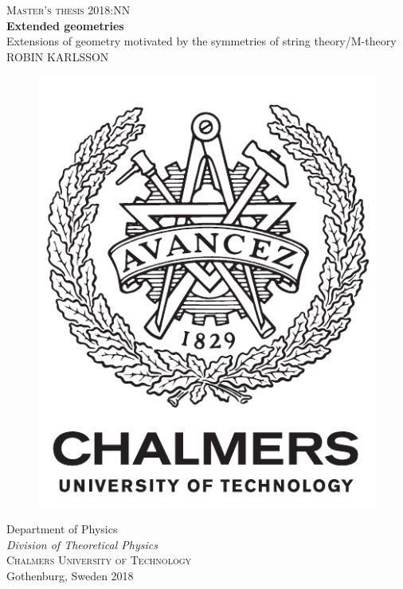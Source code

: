 \newpage
\thispagestyle{empty}
\begin{center}
	\textsc{\large Master's thesis 2018:NN}\\[4cm]		%
	\textbf{{\Huge 	Extended geometries}} 	\\[1cm]
	{\large Extensions of geometry motivated by the symmetries of string theory/M-theory}\\[1cm]
	{\large ROBIN KARLSSON}
	
	\vfill	
	\begin{figure}[H]
	\centering
	\includegraphics[width=0.2\pdfpagewidth]{figure/auxiliary/logo_eng.pdf} \\	
	\end{figure}	\vspace{5mm}	
	
	Department of Physics \\
	\emph{Division of Theoretical Physics}\\
	\textsc{Chalmers University of Technology} \\
	Gothenburg, Sweden 2018 \\
\end{center}


